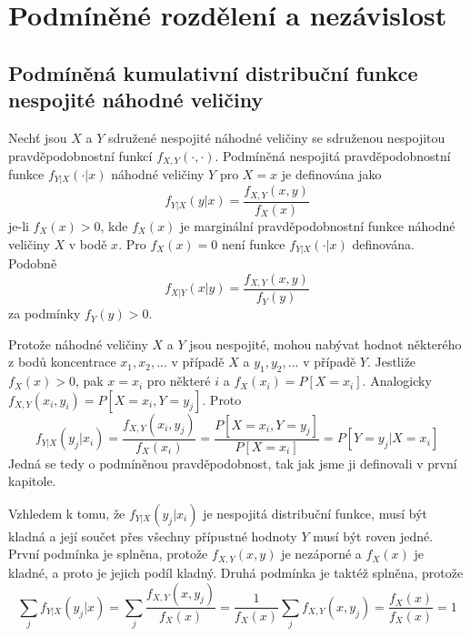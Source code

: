 \section{Podmíněné rozdělení a nezávislost}

\subsection{Podmíněná kumulativní distribuční funkce nespojité náhodné veličiny}

\begin{definition}
Nechť jsou $X$ a $Y$ sdružené nespojité náhodné veličiny se sdruženou nespojitou pravděpodobnostní funkcí $f_{X,Y}(\cdot, \cdot)$. Podmíněná nespojitá pravděpodobnostní funkce $f_{Y|X}(\cdot | x)$ náhodné veličiny $Y$ pro $X = x$ je definována jako
\begin{equation*}
f_{Y|X}(y|x) = \frac{f_{X,Y}(x,y)}{f_X(x)}
\end{equation*}
je-li $f_X(x) > 0$, kde $f_X(x)$ je marginální pravděpodobnostní funkce náhodné veličiny $X$ v bodě $x$. Pro $f_X(x) = 0$ není funkce $f_{Y|X}(\cdot | x)$ definována. Podobně
\begin{equation*}
f_{X|Y}(x|y) = \frac{f_{X,Y}(x,y)}{f_Y(y)}
\end{equation*}
za podmínky $f_Y(y) > 0$.
\end{definition}

Protože náhodné veličiny $X$ a $Y$ jsou nespojité, mohou nabývat hodnot některého z bodů koncentrace $x_1, x_2,...$ v případě $X$ a $y_1, y_2, ...$ v případě $Y$. Jestliže $f_X(x) > 0$, pak $x = x_i$ pro některé $i$ a $f_X(x_i) = P[X = x_i]$. Analogicky $f_{X,Y}(x_i, y_i) = P[X = x_i, Y = y_j]$. Proto
\begin{equation*}
f_{Y|X}(y_j|x_i) = \frac{f_{X,Y}(x_i, y_j)}{f_X(x_i)} = \frac{P[X = x_i, Y = y_j]}{P[X = x_i]} = P[Y = y_j | X = x_i]
\end{equation*}
Jedná se tedy o podmíněnou pravděpodobnost, tak jak jsme ji definovali v první kapitole.

Vzhledem k tomu, že $f_{Y|X}(y_j|x_i)$ je nespojitá distribuční funkce, musí být kladná a její součet přes všechny přípustné hodnoty $Y$ musí být roven jedné. První podmínka je splněna, protože $f_{X,Y}(x,y)$ je nezáporné a $f_X(x)$ je kladné, a proto je jejich podíl kladný. Druhá podmínka je taktéž splněna, protože
\begin{equation*}
\sum_j f_{Y|X}(y_j|x) = \sum_j \frac{f_{X,Y}(x, y_j)}{f_X(x)} = \frac{1}{f_X(x)} \sum_j f_{X,Y}(x,y_j) = \frac{f_X(x)}{f_X(x)} = 1
\end{equation*} 

